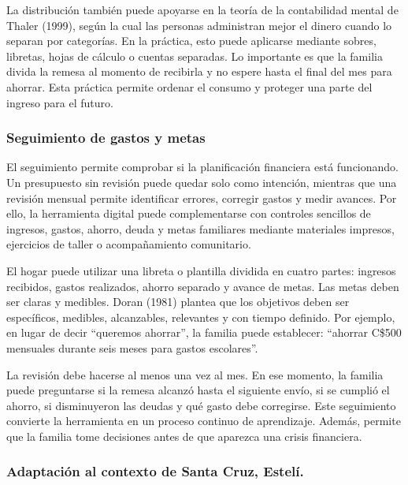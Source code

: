 \documentclass[12pt,letterpaper]{article}
\begin{document}
La distribución también puede apoyarse en la teoría de la contabilidad mental de Thaler (1999), según la cual las personas administran mejor el dinero cuando lo separan por categorías. En la práctica, esto puede aplicarse mediante sobres, libretas, hojas de cálculo o cuentas separadas. Lo importante es que la familia divida la remesa al momento de recibirla y no espere hasta el final del mes para ahorrar. Esta práctica permite ordenar el consumo y proteger una parte del ingreso para el futuro.

\subsubsection{\texorpdfstring{\textbf{Seguimiento de gastos y metas}}{Seguimiento de gastos y metas}}\label{seguimiento-de-gastos-y-metas}

El seguimiento permite comprobar si la planificación financiera está funcionando. Un presupuesto sin revisión puede quedar solo como intención, mientras que una revisión mensual permite identificar errores, corregir gastos y medir avances. Por ello, la herramienta digital puede complementarse con controles sencillos de ingresos, gastos, ahorro, deuda y metas familiares mediante materiales impresos, ejercicios de taller o acompañamiento comunitario.

El hogar puede utilizar una libreta o plantilla dividida en cuatro partes: ingresos recibidos, gastos realizados, ahorro separado y avance de metas. Las metas deben ser claras y medibles. Doran (1981) plantea que los objetivos deben ser específicos, medibles, alcanzables, relevantes y con tiempo definido. Por ejemplo, en lugar de decir ``queremos ahorrar'', la familia puede establecer: ``ahorrar C\$500 mensuales durante seis meses para gastos escolares''.

La revisión debe hacerse al menos una vez al mes. En ese momento, la familia puede preguntarse si la remesa alcanzó hasta el siguiente envío, si se cumplió el ahorro, si disminuyeron las deudas y qué gasto debe corregirse. Este seguimiento convierte la herramienta en un proceso continuo de aprendizaje. Además, permite que la familia tome decisiones antes de que aparezca una crisis financiera.

\subsubsection{\texorpdfstring{\textbf{Adaptación al contexto de Santa Cruz, Estelí.}}{Adaptación al contexto de Santa Cruz, Estelí.}}\label{adaptaciuxf3n-al-contexto-de-santa-cruz-esteluxed.}
\end{document}
